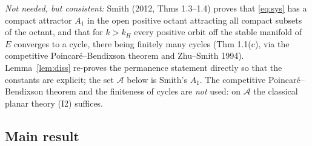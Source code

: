 \documentclass[11pt,a4paper]{article}
\numberwithin{equation}{section}
\theoremstyle{remark}\newtheorem{remark}[theorem]{Remark}
\newcommand{\cA}{\mathcal A}
\begin{document}
\emph{Not needed, but consistent:} Smith (2012, Thms 1.3--1.4) proves that \eqref{eq:sys} has a compact attractor
$A_1$ in the open positive octant attracting all compact subsets of the octant, and that for $k>k_H$ every positive
orbit off the stable manifold of $E$ converges to a cycle, there being finitely many cycles (Thm 1.1(c), via the
competitive Poincar\'e--Bendixson theorem and Zhu--Smith 1994). Lemma~\ref{lem:diss} re-proves the permanence
statement directly so that the constants are explicit; the set $\cA$ below is Smith's $A_1$. The competitive
Poincar\'e--Bendixson theorem and the finiteness of cycles are \emph{not} used: on $\cA$ the classical planar theory
(I2) suffices.

\subsection{Main result}
\end{document}
